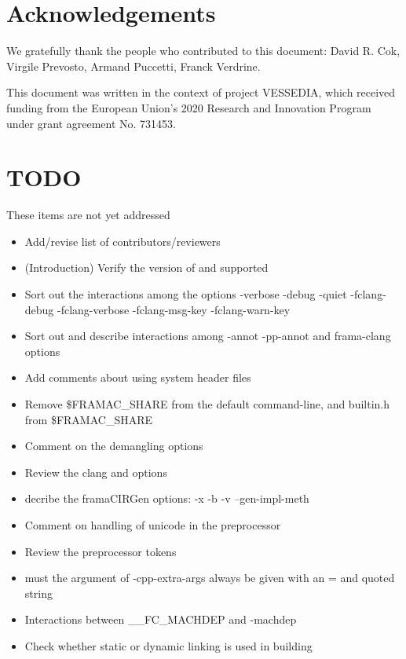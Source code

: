 \documentclass[web]{frama-c-book}
\begin{document}
\section*{Acknowledgements}

We gratefully thank the people who contributed to this document:
David R. Cok, Virgile Prevosto, Armand Puccetti, Franck Verdrine.

This document was written in the context of project VESSEDIA,
which received funding from the European Union's 2020
Research and Innovation Program under grant agreement
No. 731453.













\appendix



\section*{TODO}

These items are not yet addressed
\begin{itemize}
\item Add/revise list of contributors/reviewers
\item (Introduction) Verify the version of \framac and \clang supported
\item Sort out the interactions among the options -verbose -debug -quiet -fclang-debug -fclang-verbose -fclang-msg-key -fclang-warn-key
\item Sort out and describe interactions among -annot -pp-annot and frama-clang options
\item Add comments about using system header files
\item Remove \$FRAMAC\_SHARE from the default command-line, and builtin.h from \$FRAMAC\_SHARE
\item Comment on the demangling options
\item Review the clang and \irg options
\item decribe the framaCIRGen options: -x -b -v --gen-impl-meth
\item Comment on handling of unicode in the preprocessor
\item Review the preprocessor tokens
\item must the argument of -cpp-extra-args always be given with an = and quoted string
\item Interactions between \_\_FC\_MACHDEP and -machdep
\item Check whether static or dynamic linking is used in building
\end{itemize}
\end{document}
